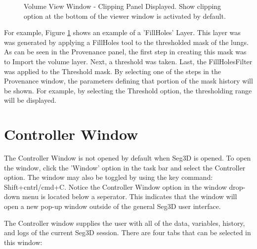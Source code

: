 \documentclass[fleqn,11pt,openany]{book}
\begin{document}
\begin{figure}[b!]
\caption{Volume View Window - Clipping Panel Displayed. Show clipping option at the bottom of the viewer window is activated by default.}\label{fig:ProvenanceWindow}
\end{figure}

For example, Figure \ref{fig:ProvenanceWindow} shows an example of a 'FillHoles' Layer.
This layer was was generated by applying a FillHoles tool to the thresholded mask of the lungs.
As can be seen in the Provenance panel, the first step in creating this mask was to Import the volume layer.  
Next, a threshold was taken.  Last, the FillHolesFilter was applied to the Threshold mask.
By selecting one of the steps in the Provenance window, the parameters defining that portion of the mask history will be shown.
For example, by selecting the Threshold option, the thresholding range will be displayed.

\section{Controller Window}
The Controller Window is not opened by default when Seg3D is opened.  To open the window, click the 'Window' option in the task bar and select the Controller option.  The window may also be toggled by using the key command: Shift+cntrl/cmd+C.
Notice the Controller Window option in the window drop-down menu is located below a seperator.  
This indicates that the window will open a new pop-up window outside of the general Seg3D user interface.

The Controller window supplies the user with all of the data, variables, history, and logs of the current Seg3D session.
There are four tabs that can be selected in this window:
\end{document}
